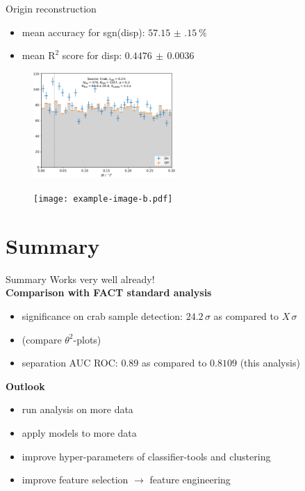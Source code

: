 \begin{frame}[t]{Origin reconstruction}
\begin{itemize}
    \item mean accuracy for sgn(disp): $\SI{57.15(15)}{\percent}$
    \item mean $\text{R}^2$ score for disp: $0.4476\,\pm\,0.0036$
\end{itemize}
\begin{multicols}{2}
\begin{figure}
    \centering
    \includegraphics[width=0.48\textwidth]{fig/theta.pdf}
\end{figure}
\columnbreak
\begin{figure}
    \centering
    \texttt{[image: example-image-b.pdf]}
\end{figure}
\end{multicols}
\end{frame}

\section{Summary}

\begin{frame}[t]{Summary}
Works very well already! \\
\vspace{10px}
\textbf{{\color{tugreen} Comparison with FACT standard analysis}}
\begin{itemize}
    \item significance on crab sample detection: $24.2\,\sigma$ as compared to $X\,\sigma$
    \item (compare $\theta^2$-plots)
    \item separation AUC ROC: $0.89$ as compared to $0.8109$ (this analysis)
\end{itemize}
\vspace{20px}
\textbf{{\color{tugreen} Outlook}}
\begin{itemize}
    \item run analysis on more data
    \item apply models to more data
    \item improve hyper-parameters of classifier-tools and clustering
    \item improve feature selection $\rightarrow$ feature engineering
\end{itemize}
\end{frame}


% 


